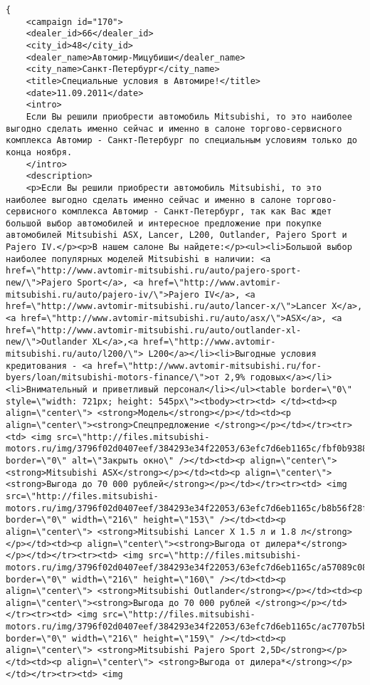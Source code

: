 \documentclass[a4paper,9pt]{extarticle}
\begin{document}
		\xmllisting
		\lstset{caption=}
		\begin{lstlisting}
{
	<campaign id="170">
	<dealer_id>66</dealer_id>
	<city_id>48</city_id>
	<dealer_name>Автомир-Мицубиши</dealer_name>
	<city_name>Санкт-Петербург</city_name>
	<title>Специальные условия в Автомире!</title>
	<date>11.09.2011</date>
	<intro>
	Если Вы решили приобрести автомобиль Mitsubishi, то это наиболее выгодно сделать именно сейчас и именно в салоне торгово-сервисного комплекса Автомир - Санкт-Петербург по специальным условиям только до конца ноября.
	</intro>
	<description>
	<p>Если Вы решили приобрести автомобиль Mitsubishi, то это наиболее выгодно сделать именно сейчас и именно в салоне торгово-сервисного комплекса Автомир - Санкт-Петербург, так как Вас ждет большой выбор автомобилей и интересное предложение при покупке автомобилей Mitsubishi ASX, Lancer, L200, Outlander, Pajero Sport и Pajero IV.</p><p>В нашем салоне Вы найдете:</p><ul><li>Большой выбор наиболее популярных моделей Mitsubishi в наличии: <a href=\"http://www.avtomir-mitsubishi.ru/auto/pajero-sport-new/\">Pajero Sport</a>, <a href=\"http://www.avtomir-mitsubishi.ru/auto/pajero-iv/\">Pajero IV</a>, <a href=\"http://www.avtomir-mitsubishi.ru/auto/lancer-x/\">Lancer X</a>, <a href=\"http://www.avtomir-mitsubishi.ru/auto/asx/\">ASX</a>, <a href=\"http://www.avtomir-mitsubishi.ru/auto/outlander-xl-new/\">Outlander XL</a>,<a href=\"http://www.avtomir-mitsubishi.ru/auto/l200/\"> L200</a></li><li>Выгодные условия кредитования - <a href=\"http://www.avtomir-mitsubishi.ru/for-byers/loan/mitsubishi-motors-finance/\">от 2,9% годовых</a></li><li>Внимательный и приветливый персонал</li></ul><table border=\"0\" style=\"width: 721px; height: 545px\"><tbody><tr><td> </td><td><p align=\"center\"> <strong>Модель</strong></p></td><td><p align=\"center\"><strong>Спецпредложение </strong></p></td></tr><tr><td> <img src=\"http://files.mitsubishi-motors.ru/img/3796f02d0407eef/384293e34f22053/63efc7d6eb1165c/fbf0b938823dea903e7ab0c19a1b295f.jpg\" border=\"0\" alt=\"Закрыть окно\" /></td><td><p align=\"center\"><strong>Mitsubishi ASX</strong></p></td><td><p align=\"center\"><strong>Выгода до 70 000 рублей</strong></p></td></tr><tr><td> <img src=\"http://files.mitsubishi-motors.ru/img/3796f02d0407eef/384293e34f22053/63efc7d6eb1165c/b8b56f28f59f931df9a5d283b087d20f.jpg\" border=\"0\" width=\"216\" height=\"153\" /></td><td><p align=\"center\"> <strong>Mitsubishi Lancer X 1.5 л и 1.8 л</strong></p></td><td><p align=\"center\"><strong>Выгода от дилера*</strong></p></td></tr><tr><td> <img src=\"http://files.mitsubishi-motors.ru/img/3796f02d0407eef/384293e34f22053/63efc7d6eb1165c/a57089c08f88b7139a5a522c13e941db.jpg\" border=\"0\" width=\"216\" height=\"160\" /></td><td><p align=\"center\"> <strong>Mitsubishi Outlander</strong></p></td><td><p align=\"center\"><strong>Выгода до 70 000 рублей </strong></p></td></tr><tr><td> <img src=\"http://files.mitsubishi-motors.ru/img/3796f02d0407eef/384293e34f22053/63efc7d6eb1165c/ac7707b5bb1e7d4a65ce880aa338935a.jpg\" border=\"0\" width=\"216\" height=\"159\" /></td><td><p align=\"center\"> <strong>Mitsubishi Pajero Sport 2,5D</strong></p></td><td><p align=\"center\"> <strong>Выгода от дилера*</strong></p></td></tr><tr><td> <img 
\end{lstlisting}
\end{document}
